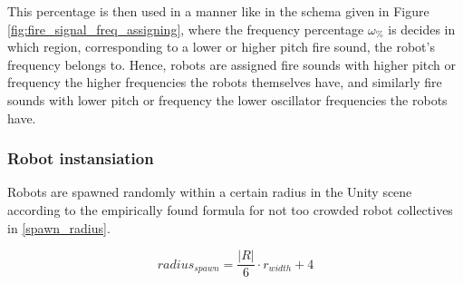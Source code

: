 			This percentage is then used in a manner like in the schema given in Figure \ref{fig:fire_signal_freq_assigning}, where the frequency percentage $\omega_\%$ is decides in which region, corresponding to a lower or higher pitch fire sound, the robot's frequency belongs to. Hence, robots are assigned fire sounds with higher pitch or frequency the higher frequencies the robots themselves have, and similarly fire sounds with lower pitch or frequency the lower oscillator frequencies the robots have.

		\subsubsection{Robot instansiation}
		
		Robots are spawned randomly within a certain radius in the Unity scene according to the empirically found formula for not too crowded robot collectives in \eqref{spawn_radius}.
		
		\begin{equation}\label{spawn_radius}
			radius_{spawn} = \frac{|R|}{6} \cdot r_{width} + 4
		\end{equation}




	


	
	
